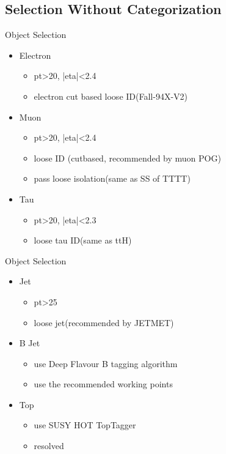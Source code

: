 \documentclass{beamer}
\begin{document}
\subsection{Selection Without Categorization}
\begin{frame}{Object Selection}
  \begin{itemize}
  \item
    Electron 
    \begin{itemize}
    \item
        pt>20, |eta|<2.4
    \item
        electron cut based loose ID(Fall-94X-V2)
    \end{itemize}
  \item
    Muon
    \begin{itemize}
    \item
        pt>20, |eta|<2.4
    \item
        loose ID (cutbased, recommended by muon POG)
    \item
        pass loose isolation(same as SS of TTTT)
    \end{itemize}
  \item
    Tau
    \begin{itemize}
    \item
        pt>20, |eta|<2.3
    \item
        loose tau ID(same as ttH)
    \end{itemize}
  \end{itemize}
\end{frame}


\begin{frame}{Object Selection}
  \begin{itemize}
  \item
    Jet
    \begin{itemize}
    \item
        pt>25
    \item
        loose jet(recommended by JETMET)
    \end{itemize}
  \item
     B Jet
     \begin{itemize}
        \item
            use Deep Flavour B tagging algorithm 
        \item 
            use the recommended working points
     \end{itemize}
  \item
      Top 
    \begin{itemize}
    \item
        use SUSY HOT TopTagger 
    \item 
        resolved
    \end{itemize}

  \end{itemize}
\end{frame}
\end{document}
